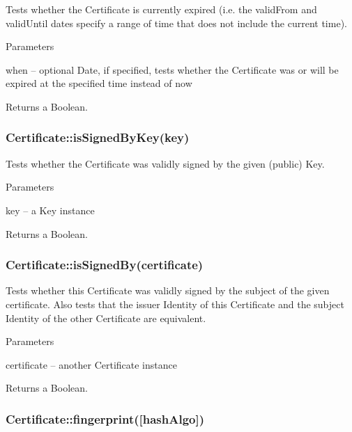 Tests whether the Certificate is currently expired (i.\+e. the {\ttfamily valid\+From} and {\ttfamily valid\+Until} dates specify a range of time that does not include the current time).

Parameters


\begin{DoxyItemize}
\item {\ttfamily when} -- optional Date, if specified, tests whether the Certificate was or will be expired at the specified time instead of now
\end{DoxyItemize}

Returns a Boolean.

\subsubsection*{{\ttfamily Certificate\+::is\+Signed\+By\+Key(key)}}

Tests whether the Certificate was validly signed by the given (public) Key.

Parameters


\begin{DoxyItemize}
\item {\ttfamily key} -- a Key instance
\end{DoxyItemize}

Returns a Boolean.

\subsubsection*{{\ttfamily Certificate\+::is\+Signed\+By(certificate)}}

Tests whether this Certificate was validly signed by the subject of the given certificate. Also tests that the issuer Identity of this Certificate and the subject Identity of the other Certificate are equivalent.

Parameters


\begin{DoxyItemize}
\item {\ttfamily certificate} -- another Certificate instance
\end{DoxyItemize}

Returns a Boolean.

\subsubsection*{{\ttfamily Certificate\+::fingerprint(\mbox{[}hash\+Algo\mbox{]})}}

